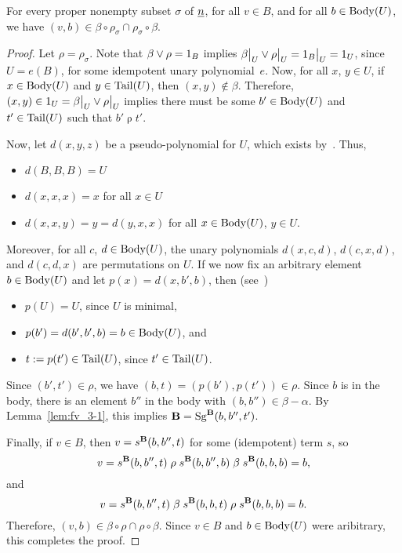 \begin{lemma}\label{lem:nearperm}
  For every proper nonempty subset $\sigma$ of $\underline{n}$,
  for all $v\in B$, and for all $b\in \operatorname{Body}(U)$, we have
  $(v,b) \in \beta \circ \rho_\sigma \cap \rho_\sigma \circ \beta$.
\end{lemma}

\newcommand\rhosig{\ensuremath{\rho}}
\begin{proof}
\noindent Let $\rho = \rho_\sigma$. Note that
$\beta \join \rhosig = 1_B$ implies
$\restr{\beta}{U} \join \restr{\rhosig}{U} = \restr{1_B}{U} = 1_U$, 
since $U = e(B)$, for some idempotent unary polynomial~$e$.
Now, for all $x$, $y \in U$, if $x\in \operatorname{Body}(U)$ and $y\in \operatorname{Tail}(U)$, then
$(x,y) \notin \beta$.  Therefore,
$(x, y) \in  1_U = \restr{\beta}{U} \join \restr{\rhosig}{U}$ implies
there must be some $b' \in \operatorname{Body}(U)$ and $t'\in \operatorname{Tail}(U)$ such that 
$b' \mathrel{\rhosig} t'$.  

Now, let $d(x,y,z)$ be a pseudo-\malcev polynomial for $U$,
which exists by~\cite[Lemma~4.20]{HM:1988}.
Thus,
\begin{itemize}
\item $d(B,B,B) = U$
\item $d(x,x,x) = x$ for all $x\in U$
\item $d(x,x,y) = y = d(y,x,x)$ for all $x\in \operatorname{Body}(U)$, $y \in U$.
\end{itemize}
Moreover, for all $c$, $d \in \operatorname{Body}(U)$, the unary polynomials
$d(x,c,d)$, $d(c,x,d)$, and $d(c,d,x)$ are permutations on $U$.
If we now fix an arbitrary element $b\in \operatorname{Body}(U)$ and
let $p(x) = d(x,b',b)$, then (see~\cite[Lemma~4.20]{HM:1988})
\begin{itemize}
\item  $p(U) = U$, since $U$ is minimal,
\item $p(b') = d(b',b',b) = b \in \operatorname{Body}(U)$, and
\item  $t:=p(t')\in \operatorname{Tail}(U)$, since $t'\in \operatorname{Tail}(U)$.
\end{itemize}
Since $(b',t') \in \rhosig$, we have $(b, t) = (p(b'), p(t')) \in \rhosig$. 
Since $b$ is in the body, there is an element $b''$ in the body with
$(b,b'') \in \beta - \alpha$. By Lemma~\ref{lem:fv_3-1}, this implies
$\mathbf{B} = \operatorname{Sg}^{\mathbf{B}}(b, b'', t')$.

Finally, if $v \in B$, then $v = s^{\mathbf{B}}(b,b'',t)$ for 
some (idempotent) term $s$, so
\[
v = s^{\alg{B}}(b,b'',t)
\mathrel{\rhosig} s^{\alg{B}}(b,b'',b)
\mathrel{\beta} s^{\alg{B}}(b,b,b) = b,
\]
and
\[
v = s^{\alg{B}}(b,b'',t)
\mathrel{\beta}  s^{\alg{B}}(b,b,t)
\mathrel{\rhosig}s^{\alg{B}}(b,b, b)  = b.
\]
Therefore, 
$(v,b) \in  \beta \circ \rhosig \cap \rhosig \circ \beta$.
Since $v \in B$ and $b\in \operatorname{Body}(U)$ were aribitrary,
this completes the proof.
\end{proof}




